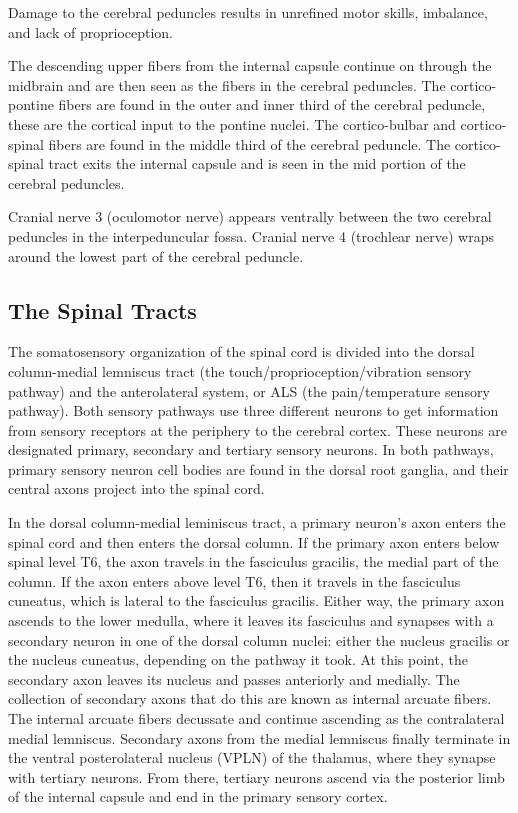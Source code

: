Damage to the cerebral peduncles results in unrefined motor skills, imbalance, and lack of proprioception.

The descending upper fibers from the internal capsule continue on through the midbrain and are then seen as the fibers in the cerebral peduncles. The cortico-pontine fibers are found in the outer and inner third of the cerebral peduncle, these are the cortical input to the pontine nuclei. The cortico-bulbar and cortico-spinal fibers are found in the middle third of the cerebral peduncle. The cortico-spinal tract exits the internal capsule and is seen in the mid portion of the cerebral peduncles.

Cranial nerve 3 (oculomotor nerve) appears ventrally between the two cerebral peduncles in the interpeduncular fossa. Cranial nerve 4 (trochlear nerve) wraps around the lowest part of the cerebral peduncle.

\hypertarget{the-spinal-tracts}{%
\subsection{The Spinal Tracts}\label{the-spinal-tracts}}

The somatosensory organization of the spinal cord is divided into the dorsal column-medial lemniscus tract (the touch/proprioception/vibration sensory pathway) and the anterolateral system, or ALS (the pain/temperature sensory pathway). Both sensory pathways use three different neurons to get information from sensory receptors at the periphery to the cerebral cortex. These neurons are designated primary, secondary and tertiary sensory neurons. In both pathways, primary sensory neuron cell bodies are found in the dorsal root ganglia, and their central axons project into the spinal cord.

In the dorsal column-medial leminiscus tract, a primary neuron's axon enters the spinal cord and then enters the dorsal column. If the primary axon enters below spinal level T6, the axon travels in the fasciculus gracilis, the medial part of the column. If the axon enters above level T6, then it travels in the fasciculus cuneatus, which is lateral to the fasciculus gracilis. Either way, the primary axon ascends to the lower medulla, where it leaves its fasciculus and synapses with a secondary neuron in one of the dorsal column nuclei: either the nucleus gracilis or the nucleus cuneatus, depending on the pathway it took. At this point, the secondary axon leaves its nucleus and passes anteriorly and medially. The collection of secondary axons that do this are known as internal arcuate fibers. The internal arcuate fibers decussate and continue ascending as the contralateral medial lemniscus. Secondary axons from the medial lemniscus finally terminate in the ventral posterolateral nucleus (VPLN) of the thalamus, where they synapse with tertiary neurons. From there, tertiary neurons ascend via the posterior limb of the internal capsule and end in the primary sensory cortex.


